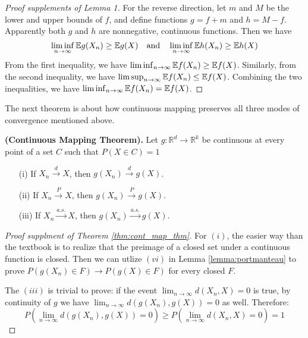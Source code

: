 \documentclass{article}
\begin{document}
\begin{proof}[Proof supplements of Lemma 1]
    For the reverse direction, let $m$ and $M$ be the lower and upper bounds of $f$, and define functions $g = f + m$ and $h = M - f$. Apparently both $g$ and $h$ are nonnegative, continuous functions. Then we have
    \begin{equation}
        \liminf_{n\to\infty} \mathbb{E} g(X_n) \geq \mathbb{E} g(X) \quad \text{and} \quad \liminf_{n\to\infty} \mathbb{E} h(X_n) \geq \mathbb{E} h(X)
    \end{equation}
    From the first inequality, we have $\liminf_{n\to\infty} \mathbb{E} f(X_n) \geq \mathbb{E} f(X)$. Similarly, from the second inequality, we have $\limsup_{n\to\infty} \mathbb{E} f(X_n) \leq \mathbb{E} f(X)$. Combining the two inequalities, we have $\liminf_{n\to\infty} \mathbb{E} f(X_n) = \mathbb{E} f(X)$.
\end{proof}

The next theorem is about how continuous mapping preserves all three modes of convergence mentioned above.

\begin{theorem}
    \label{thm:cont_map_thm}
    \textbf{(Continuous Mapping Theorem).} Let $g: \mathbb{R}^d \to \mathbb{R}^k$ be continuous at every point of a set \( C \) such that \( P(X \in C) = 1 \)
    \begin{enumerate}
    \item[(i)] If $X_n \xrightarrow{d} X$, then $g(X_n) \xrightarrow{d} g(X)$.
    \item[(ii)] If $X_n \xrightarrow{P} X$, then $g(X_n) \xrightarrow{P} g(X)$.
    \item[(iii)] If $X_n \xrightarrow{a.s.} X$, then $g(X_n) \xrightarrow{a.s.} g(X)$.
    \end{enumerate}   
\end{theorem}

\begin{proof}[Proof supplment of Theorem \ref*{thm:cont_map_thm}]
    For $(i)$, the easier way than the textbook is to realize that the preimage of a closed set under a continuous function is closed. Then we can utlize $(vi)$ in Lemma \ref{lemma:portmanteau} to prove $P(g(X_n) \in F) \to P(g(X) \in F)$ for every closed $F$.

    The $(iii)$ is trivial to prove: if the event $\lim_{n\to\infty}d(X_n, X) = 0$ is true, by continuity of $g$ we have $\lim_{n\to\infty}d(g(X_n), g(X)) = 0$ as well. Therefore:
    \begin{equation}
        P\left(\lim_{n\to\infty}d(g(X_n), g(X)) = 0\right) \geq P\left(\lim_{n\to\infty}d(X_n, X) = 0\right) = 1
    \end{equation}
\end{proof}
\end{document}
